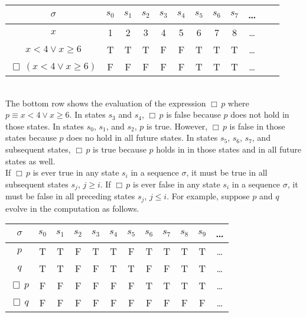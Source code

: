 \documentclass[fleqn, leqno]{article}
\newcommand{\Always}{\Box\,}
\begin{document}
\begin{tabular}{c|ccccccccccc}
  $\sigma$                      & $s_0$ & $s_1$ & $s_2$ & $s_3$ & $s_4$ & $s_5$ & $s_6$ & $s_7$ & \dots \\
  \hline
  $x$                           & 1     & 2     & 3     & 4     & 5     & 6     & 7     & 8     &  \dots\\
  $x < 4 \lor x \ge 6$          & T     & T     & T     & F     & F     & T     & T     & T     &  \dots\\
  $\Always(x < 4 \lor x \ge 6)$ & F     & F     & F     & F     & F     & T     & T     & T     &  \dots\\
\end{tabular}\\

The bottom row shows the evaluation of the expression $\Always p$ where $p\equiv x < 4 \lor x \ge 6$.
In states $s_3$ and $s_4$, $\Always p$ is false because $p$ does not hold in those states.
In states $s_0$, $s_1$, and $s_2$, $p$ is true. However, $\Always p$ is false in those states because $p$ does no hold
in all future states.
In states $s_5$, $s_6$, $s_7$, and subsequent states, $\Always p$ is true because $p$ holds in in those states
and in all future states as well.\\

If $\Always p$ is ever true in any state $s_i$ in a sequence $\sigma$, it must be true in all subsequent states $s_j$, $j\ge i$.
If $\Always p$ is ever false in any state $s_i$ in a sequence $\sigma$, it must be false in all preceding states $s_j$, $j\le i$.
For example, suppose $p$ and $q$ evolve in the computation as follows.\\

\begin{tabular}{c|ccccccccccc}
  $\sigma$       & $s_0$ & $s_1$ & $s_2$ & $s_3$ & $s_4$ & $s_5$ & $s_6$ & $s_7$ & $s_8$& $s_9$  & \dots \\
  \hline
  $p$            & T     & T     & F     & T     & T     & F     & T     & T     & T     & T     &  \dots\\
  $q$            & T     & T     & F     & F     & T     & T     & F     & F     & T     & T     &  \dots\\
  $\Always p$    & F     & F     & F     & F     & F     & F     & T     & T     & T     & T     &  \dots\\
  $\Always q$    & F     & F     & F     & F     & F     & F     & F     & F     & F     & F     &  \dots\\
\end{tabular}\\
\end{document}
